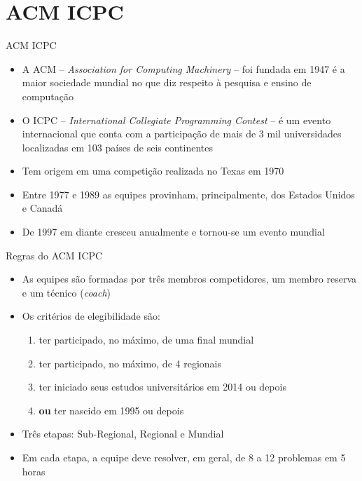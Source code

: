 \section{ACM ICPC}

\begin{frame}[fragile]{ACM ICPC}

    \begin{itemize}
        \item A ACM -- \textit{Association for Computing Machinery} -- foi fundada em 1947 é 
        a maior sociedade mundial no que diz respeito à pesquisa e ensino de computação
        \item O ICPC -- \textit{International Collegiate Programming Contest} -- é um evento
        internacional que conta com a participação de mais de 3 mil universidades localizadas em
        103 países de seis continentes
        \item Tem origem em uma competição realizada no Texas em 1970
        \item Entre 1977 e 1989 as equipes provinham, principalmente, dos Estados Unidos e Canadá
        \item De 1997 em diante cresceu anualmente e tornou-se um evento mundial
    \end{itemize}

\end{frame}

\begin{frame}[fragile]{Regras do ACM ICPC}

    \begin{itemize}
        \item As equipes são formadas por três membros competidores, um membro reserva e um 
        técnico (\textit{coach})
        \item Os critérios de elegibilidade são:
            \begin{enumerate}
                \item ter participado, no máximo, de uma final mundial
                \item ter participado, no máximo, de 4 regionais
                \item ter iniciado seus estudos universitários em 2014 ou depois
                \item \textbf{ou} ter nascido em 1995 ou depois
            \end{enumerate}
        \item Três etapas: Sub-Regional, Regional e Mundial
        \item Em cada etapa, a equipe deve resolver, em geral, de 8 a 12 problemas em 5 horas
    \end{itemize}

\end{frame}

